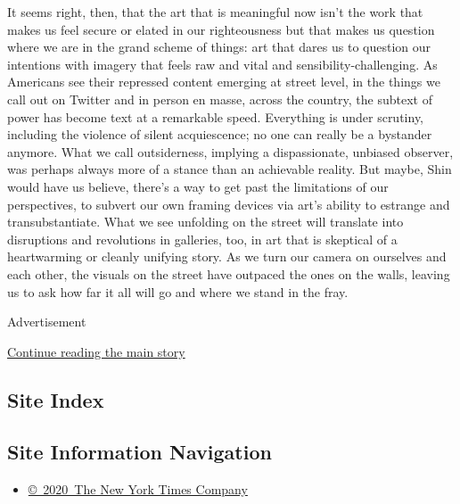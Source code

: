 It seems right, then, that the art that is meaningful now isn't the work
that makes us feel secure or elated in our righteousness but that makes
us question where we are in the grand scheme of things: art that dares
us to question our intentions with imagery that feels raw and vital and
sensibility-challenging. As Americans see their repressed content
emerging at street level, in the things we call out on Twitter and in
person en masse, across the country, the subtext of power has become
text at a remarkable speed. Everything is under scrutiny, including the
violence of silent acquiescence; no one can really be a bystander
anymore. What we call outsiderness, implying a dispassionate, unbiased
observer, was perhaps always more of a stance than an achievable
reality. But maybe, Shin would have us believe, there's a way to get
past the limitations of our perspectives, to subvert our own framing
devices via art's ability to estrange and transubstantiate. What we see
unfolding on the street will translate into disruptions and revolutions
in galleries, too, in art that is skeptical of a heartwarming or cleanly
unifying story. As we turn our camera on ourselves and each other, the
visuals on the street have outpaced the ones on the walls, leaving us to
ask how far it all will go and where we stand in the fray.

Advertisement

\protect\hyperlink{after-bottom}{Continue reading the main story}

\hypertarget{site-index}{%
\subsection{Site Index}\label{site-index}}

\hypertarget{site-information-navigation}{%
\subsection{Site Information
Navigation}\label{site-information-navigation}}

\begin{itemize}
\tightlist
\item
  \href{https://help.nytimes3xbfgragh.onion/hc/en-us/articles/115014792127-Copyright-notice}{©~2020~The
  New York Times Company}
\end{itemize}

